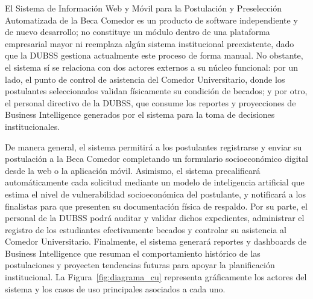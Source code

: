 \label{sec:ieee_descripcion_general}

\label{sec:ieee_perspectiva}

El Sistema de Información Web y Móvil para la Postulación y Preselección Automatizada de la Beca Comedor es un producto de software independiente y de nuevo desarrollo; no constituye un módulo dentro de una plataforma empresarial mayor ni reemplaza algún sistema institucional preexistente, dado que la DUBSS gestiona actualmente este proceso de forma manual. No obstante, el sistema sí se relaciona con dos actores externos a su núcleo funcional: por un lado, el punto de control de asistencia del Comedor Universitario, donde los postulantes seleccionados validan físicamente su condición de becados; y por otro, el personal directivo de la DUBSS, que consume los reportes y proyecciones de Business Intelligence generados por el sistema para la toma de decisiones institucionales.

\label{sec:ieee_funciones}

De manera general, el sistema permitirá a los postulantes registrarse y enviar su postulación a la Beca Comedor completando un formulario socioeconómico digital desde la web o la aplicación móvil. Asimismo, el sistema precalificará automáticamente cada solicitud mediante un modelo de inteligencia artificial que estima el nivel de vulnerabilidad socioeconómica del postulante, y notificará a los finalistas para que presenten su documentación física de respaldo. Por su parte, el personal de la DUBSS podrá auditar y validar dichos expedientes, administrar el registro de los estudiantes efectivamente becados y controlar su asistencia al Comedor Universitario. Finalmente, el sistema generará reportes y dashboards de Business Intelligence que resuman el comportamiento histórico de las postulaciones y proyecten tendencias futuras para apoyar la planificación institucional. La Figura~\ref{fig:diagrama_cu} representa gráficamente los actores del sistema y los casos de uso principales asociados a cada uno.

